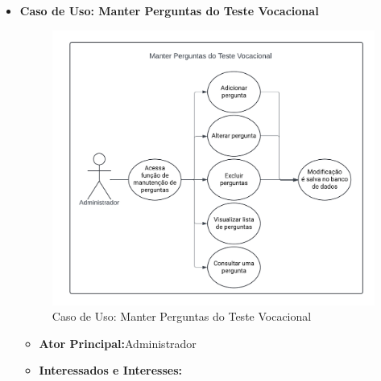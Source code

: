 \begin{itemize}
    \item \textbf{Caso de Uso: Manter Perguntas do Teste Vocacional}
    
    \begin{figure}[ht]
        \centering
        \includegraphics[scale=0.8]{caso-de-uso_manter-perguntas-do-teste-vocacional.png}
        \caption{Caso de Uso: Manter Perguntas do Teste Vocacional}
        \label{fig:enter-label}
    \end{figure}

    \begin{itemize}
        \item  \textbf{Ator Principal:}Administrador
        \item \textbf{Interessados e Interesses:}


\end{itemize}
\end{itemize}
